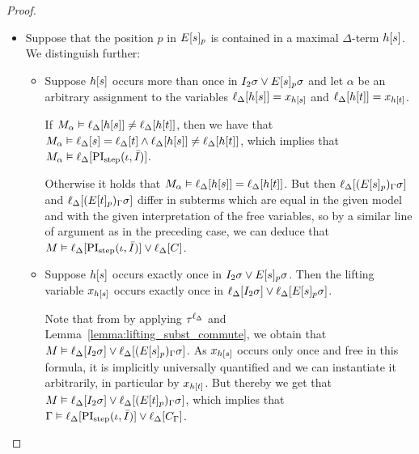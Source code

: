 \begin{proof}
\begin{indproof}
\begin{itemize}
				\item
					Suppose that the position $p$ in $E{[s]_{p}}$ is contained in a maximal $\Delta$-term $h[s]$.
					We distinguish further:

					\begin{itemize}
						\item Suppose $h[s]$ occurs more than once in $I_2\sigma \lor E{[s]_{p}}\sigma$ and let $\alpha$ be an arbitrary assignment to the variables $\ell_{\Delta}[h[s]] = x_{h[s]}$ and $\ell_{\Delta}[h[t]] = x_{h[t]}$.

							If $M_\alpha \vDash \ell_{\Delta}[h[s]] \neq \ell_{\Delta}[h[t]]$, then we have that $M_\alpha \entails \lifdeltanovar{s}\nolinebreak=\lifdeltanovar{t} \land\allowbreak \lifdeltanovar{h\occ{s}} \neq \lifdeltanovar{h\occ{t}}$, which implies that $M_\alpha \vDash \ell_{\Delta}[\operatorname{PI}_{\mathrm{step}}(\iota, \bar I)]$.

							Otherwise it holds that $M_\alpha \vDash \ell_{\Delta}[h[s]] = \ell_{\Delta}[h[t]]$.
							But then 
							$\ell_{\Delta}[(E{[s]_{p}})_\Gamma\sigma]$
							and
							$\ell_{\Delta}[(E{[t]_{p}})_\Gamma\sigma]$
							differ in subterms which are equal in the given model and with the given interpretation of the free variables,
							so by a similar line of argument as in the preceding case, we can deduce that $M \vDash \ell_{\Delta}[\operatorname{PI}_{\mathrm{step}}(\iota, \bar I)] \lor \ell_{\Delta}[C]$.

						\item Suppose $h[s]$ occurs exactly once in $I_2\sigma \lor E{[s]_{p}}\sigma$.
							Then the lifting variable $x_{h[s]}$
							occurs exactly once in $\ell_{\Delta}[I_2\sigma] \lor \ell_{\Delta}[E{[s]_{p}}\sigma]$.

							Note that from \markB{} by applying $\tau^{\ell_\Delta}$ and Lemma~\ref{lemma:lifting_subst_commute}, we obtain that $M\vDash \ell_{\Delta}[I_2\sigma] \lor \ell_{\Delta}[(E{[s]_{p}})_\Gamma\sigma]$.
							As $x_{h[s]}$ occurs only once and free in this formula, it is implicitly universally quantified and we can instantiate it arbitrarily, in particular by $x_{h[t]}$.
							But thereby we get that 
							$M\vDash \ell_{\Delta}[I_2\sigma] \lor \ell_{\Delta}[(E{[t]_{p}})_\Gamma\sigma]$, 
							which implies that
							$\Gamma\vDash \ell_{\Delta}[\operatorname{PI}_{\mathrm{step}}(\iota, \bar I)] \lor \ell_{\Delta}[C_\Gamma]$.
							\qedhere
					\end{itemize}
			\end{itemize}

	\end{indproof}
\end{proof}

